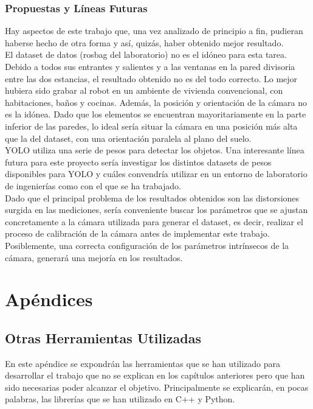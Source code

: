 \section{Propuestas y Líneas Futuras}

Hay aspectos de este trabajo que, una vez analizado de principio a fin, pudieran haberse hecho de otra forma y así, quizás, haber obtenido mejor resultado.\\

El dataset de datos (rosbag del laboratorio) no es el idóneo para esta tarea. Debido a todos sus entrantes y salientes y a las ventanas en la pared divisoria entre las dos estancias, el resultado obtenido no es del todo correcto. Lo mejor hubiera sido grabar al robot en un ambiente de vivienda convencional, con habitaciones, baños y cocinas. Además, la posición y orientación de la cámara no es la idónea. Dado que los elementos se encuentran mayoritariamente en la parte inferior de las paredes, lo ideal sería situar la cámara en una posición más alta que la del dataset, con una orientación paralela al plano del suelo.\\

YOLO utiliza una serie de pesos para detectar los objetos. Una interesante línea futura para este proyecto sería investigar los distintos datasets de pesos disponibles para YOLO y cuáles convendría utilizar en un entorno de laboratorio de ingenierías como con el que se ha trabajado.\\

Dado que el principal problema de los resultados obtenidos son las distorsiones surgida en las mediciones, sería conveniente buscar los parámetros que se ajustan concretamente a la cámara utilizada para generar el dataset, es decir, realizar el proceso de calibración de la cámara antes de implementar este trabajo. Posiblemente, una correcta configuración de los parámetros intrínsecos de la cámara, generará una mejoría en los resultados.\\


\part{Apéndices}

\appendix

\chapter{Otras Herramientas Utilizadas}

En este apéndice se expondrán las herramientas que se han utilizado para desarrollar el trabajo que no se explican en los capítulos anteriores pero que han sido necesarias poder alcanzar el objetivo. Principalmente se explicarán, en pocas palabras, las librerías que se han utilizado en C++ y Python.\\

